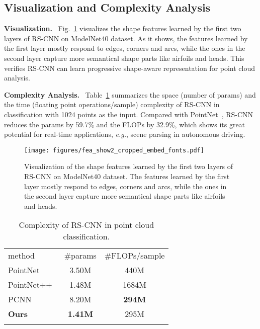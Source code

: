 \documentclass[10pt,twocolumn,letterpaper]{article}
\begin{document}
\vspace{7pt}
\subsection{Visualization and Complexity Analysis}
\vspace{7pt}
\label{subsec4.3}
\noindent \textbf{Visualization.}\,\,~Fig.~\ref{fig8:feature_show} visualizes the shape features learned by the first two layers of RS-CNN on ModelNet40 dataset. As it shows, the features learned by the first layer mostly respond to edges, corners and arcs, while the ones in the second layer capture more semantical shape parts like airfoils and heads. This verifies RS-CNN can learn progressive shape-aware representation for point cloud analysis.

\vspace{10pt}
\noindent \textbf{Complexity Analysis.}\,\,~Table~\ref{Tab8:complexity} summarizes the space (number of params) and the time (floating point operations/sample) complexity of RS-CNN in classification with 1024 points as the input. Compared with PointNet~\cite{c1_pointnet}, RS-CNN reduces the params by 59.7\% and the FLOPs by 32.9\%, which shows its great potential for real-time applications, \textit{e.g.}, scene parsing in autonomous driving.

\begin{figure}[t]
\centerline{\texttt{[image: figures/fea\_show2\_cropped\_embed\_fonts.pdf]}}
\caption{Visualization of the shape features learned by the first two layers of RS-CNN on ModelNet40 dataset. The features learned by the first layer mostly respond to edges, corners and arcs, while the ones in the second layer capture more semantical shape parts like airfoils and heads.}
\label{fig8:feature_show}
\vspace{7pt}
\end{figure}

\begin{table}[t]
  \centering
\caption{Complexity of RS-CNN in point cloud classification.}
\begin{tabular}{l|cc}
  \Xhline{0.8pt}
  method & \#params & \#FLOPs/sample \\
\Xhline{0.5pt}
  PointNet~\cite{c1_pointnet} & 3.50M & 440M \\
  PointNet++~\cite{c27} & 1.48M & 1684M \\
  PCNN~\cite{c27} & 8.20M & \textbf{294M} \\
  \textbf{Ours} & \textbf{1.41M} & 295M \\
  \Xhline{0.8pt}
  \end{tabular}
  \label{Tab8:complexity}
\end{table}
\end{document}
